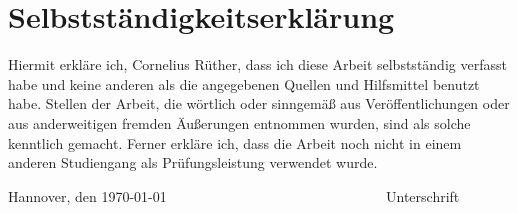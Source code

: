 \documentclass[a4paper,11pt,oneside]{book}
\theoremstyle{definition}
\theoremstyle{remark}
\newcommand{\<}{\langle}
\renewcommand{\>}{\rangle}
\renewcommand{\(}{\left(}
\renewcommand{\)}{\right)}
\newcommand{\nameofchapter}{}
\begin{document}









\nocite{*}


\newpage

\pagestyle{fancy}{
	\rhead{}
	\lhead{\sl\thechapter. \nameofchapter}
	\renewcommand{\headheight}{14pt}
	\renewcommand{\footrulewidth}{0.4pt}
	\cfoot{\thepage}
}



\newpage
{}


\printindex

\chapter*{Selbstständigkeitserklärung}

Hiermit erkläre ich, Cornelius Rüther, dass ich diese Arbeit selbstständig verfasst habe und keine anderen als die angegebenen Quellen und Hilfsmittel benutzt habe. Stellen der Arbeit, die wörtlich oder sinngemäß aus Veröffentlichungen oder aus anderweitigen fremden Äußerungen entnommen wurden, sind als solche kenntlich gemacht. Ferner erkläre ich, dass die Arbeit noch nicht in einem anderen Studiengang als Prüfungsleistung verwendet wurde.

\vspace{1.8cm}

\noindent
Hannover, den \today \hspace{1.27cm} \underline{$\qquad\qquad\qquad\qquad\qquad\qquad\qquad\quad$} \newline \text{$\, \quad$ } \hspace{8cm} Unterschrift

\backmatter
\end{document}
